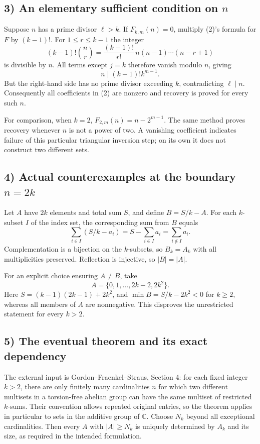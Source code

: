 \subsection*{3) An elementary sufficient condition on $n$}
Suppose $n$ has a prime divisor $\ell>k$. If $F_{k,m}(n)=0$, multiply (2)'s formula for $F$ by $(k-1)!$. For $1\le r\le k-1$ the integer
\[(k-1)!\binom nr=\frac{(k-1)!}{r!}\,n(n-1)\cdots(n-r+1)\]
is divisible by $n$. All terms except $j=k$ therefore vanish modulo $n$, giving
\[n\mid(k-1)!k^{m-1}.\]
But the right-hand side has no prime divisor exceeding $k$, contradicting $\ell\mid n$. Consequently all coefficients in (2) are nonzero and recovery is proved for every such $n$.

For comparison, when $k=2$, $F_{2,m}(n)=n-2^{m-1}$. The same method proves recovery whenever $n$ is not a power of two. A vanishing coefficient indicates failure of this particular triangular inversion step; on its own it does not construct two different sets.

\subsection*{4) Actual counterexamples at the boundary $n=2k$}
Let $A$ have $2k$ elements and total sum $S$, and define $B=S/k-A$. For each $k$-subset $I$ of the index set, the corresponding sum from $B$ equals
\[\sum_{i\in I}(S/k-a_i)=S-\sum_{i\in I}a_i
=\sum_{i\notin I}a_i.\]
Complementation is a bijection on the $k$-subsets, so $B_k=A_k$ with all multiplicities preserved. Reflection is injective, so $|B|=|A|$.

For an explicit choice ensuring $A\ne B$, take
\[A=\{0,1,\ldots,2k-2,2k^2\}.
\]
Here $S=(k-1)(2k-1)+2k^2$, and $\min B=S/k-2k^2<0$ for $k\ge2$, whereas all members of $A$ are nonnegative. This disproves the unrestricted statement for every $k>2$.

\subsection*{5) The eventual theorem and its exact dependency}
The external input is Gordon--Fraenkel--Straus, Section 4: for each fixed integer $k>2$, there are only finitely many cardinalities $n$ for which two different multisets in a torsion-free abelian group can have the same multiset of restricted $k$-sums. Their convention allows repeated original entries, so the theorem applies in particular to sets in the additive group of $\mathbb C$. Choose $N_k$ beyond all exceptional cardinalities. Then every $A$ with $|A|\ge N_k$ is uniquely determined by $A_k$ and its size, as required in the intended formulation.

